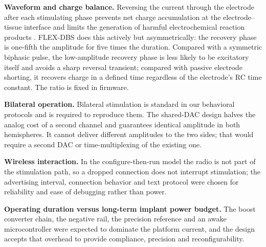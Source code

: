 \textbf{Waveform and charge balance.} Reversing the current through the electrode after each stimulating phase prevents net charge accumulation at the electrode--tissue interface and limits the generation of harmful electrochemical reaction products \citep{merrill2005}. FLEX-DBS does this actively but asymmetrically: the recovery phase is one-fifth the amplitude for five times the duration. Compared with a symmetric biphasic pulse, the low-amplitude recovery phase is less likely to be excitatory itself and avoids a sharp reversal transient; compared with passive electrode shorting, it recovers charge in a defined time regardless of the electrode's RC time constant. The ratio is fixed in firmware.

\textbf{Bilateral operation.} Bilateral stimulation is standard in our behavioral protocols \citep{aleksandrova2013} and is required to reproduce them. The shared-DAC design halves the analog cost of a second channel and guarantees identical amplitude in both hemispheres. It cannot deliver different amplitudes to the two sides; that would require a second DAC or time-multiplexing of the existing one.

\textbf{Wireless interaction.} In the configure-then-run model the radio is not part of the stimulation path, so a dropped connection does not interrupt stimulation; the advertising interval, connection behavior and text protocol were chosen for reliability and ease of debugging rather than power.

\textbf{Operating duration versus long-term implant power budget.} The boost converter chain, the negative rail, the precision reference and an awake microcontroller were expected to dominate the platform current, and the design accepts that overhead to provide compliance, precision and reconfigurability.
